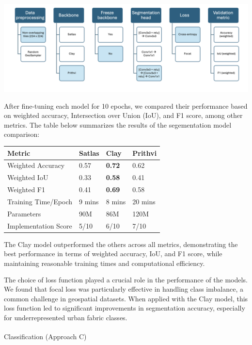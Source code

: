 \documentclass[
  letterpaper,
  DIV=11,
  numbers=noendperiod]{scrartcl}
\makeatletter
\let\oldparagraph\paragraph
\renewcommand{\paragraph}{
    \@ifstar
      \xxxParagraphStar
      \xxxParagraphNoStar
  }
\newcommand{\xxxParagraphStar}[1]{\oldparagraph*{#1}\mbox{}}
\newcommand{\xxxParagraphNoStar}[1]{\oldparagraph{#1}\mbox{}}
\makeatother
\begin{document}
\begin{center}
\includegraphics[width=6.25in,height=\textheight,keepaspectratio]{../figures/algo_design/prithvi_model.png}
\end{center}

After fine-tuning each model for 10 epochs, we compared their
performance based on weighted accuracy, Intersection over Union (IoU),
and F1 score, among other metrics. The table below summarizes the
results of the segementation model comparison:

\begin{longtable}[]{@{}llll@{}}
\toprule\noalign{}
Metric & Satlas & Clay & Prithvi \\
\midrule\noalign{}
\endhead
\bottomrule\noalign{}
\endlastfoot
Weighted Accuracy & 0.57 & \textbf{0.72} & 0.62 \\
Weighted IoU & 0.33 & \textbf{0.58} & 0.41 \\
Weighted F1 & 0.41 & \textbf{0.69} & 0.58 \\
Training Time/Epoch & 9 mins & 8 mins & 20 mins \\
Parameters & 90M & 86M & 120M \\
Implementation Score & 5/10 & 6/10 & 7/10 \\
\end{longtable}

The Clay model outperformed the others across all metrics, demonstrating
the best performance in terms of weighted accuracy, IoU, and F1 score,
while maintaining reasonable training times and computational
efficiency.

The choice of loss function played a crucial role in the performance of
the models. We found that focal loss was particularly effective in
handling class imbalance, a common challenge in geospatial datasets.
When applied with the Clay model, this loss function led to significant
improvements in segmentation accuracy, especially for underrepresented
urban fabric classes.

\paragraph{Classification (Approach C)}\label{classification-approach-c}
\end{document}
